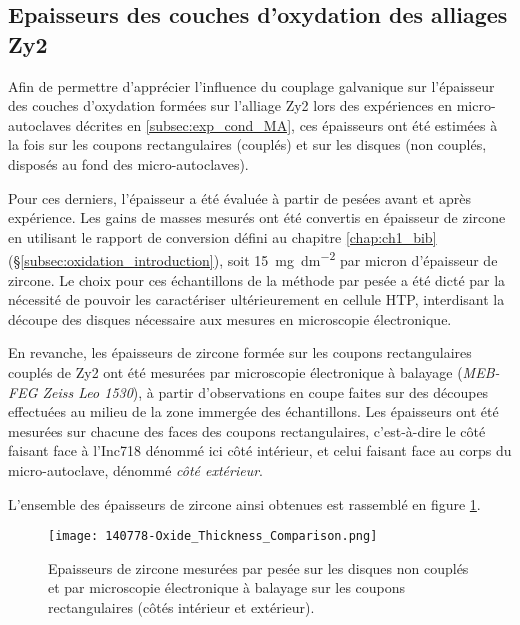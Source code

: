 \begin{refsection}
    
    \subsection{Epaisseurs des couches d’oxydation des alliages Zy2}\label{subsec:oxide_thickness}
    
    Afin de permettre d’apprécier l’influence du couplage galvanique
    sur l’épaisseur des couches d’oxydation formées sur l’alliage Zy2
    lors des expériences en micro-autoclaves décrites en \ref{subsec:exp_cond_MA}, ces épaisseurs
    ont été estimées à la fois sur les coupons rectangulaires (couplés) et sur
    les disques (non couplés, disposés au fond des micro-autoclaves).

    Pour ces derniers, l’épaisseur a été évaluée à partir de pesées avant et après expérience.
    Les gains de masses mesurés ont été convertis en épaisseur de zircone en utilisant
    le rapport de conversion défini au chapitre \ref{chap:ch1_bib} (\S \ref{subsec:oxidation_introduction}),
    soit \SI{15}{\milli\gram\per\square\deci\meter}
    par micron d’épaisseur de zircone. Le choix pour ces échantillons de la méthode par pesée
    a été dicté par la nécessité de pouvoir les caractériser ultérieurement en cellule HTP, interdisant
    la découpe des disques nécessaire aux mesures en microscopie électronique. 

    En revanche, les épaisseurs de zircone formée sur les coupons rectangulaires
    couplés de Zy2 ont été mesurées par microscopie électronique à balayage
    (\emph{MEB-FEG Zeiss Leo 1530}), à partir d’observations en coupe faites sur des
    découpes effectuées au milieu de la zone immergée des échantillons.
    Les épaisseurs ont été mesurées sur chacune des faces des coupons rectangulaires,
    c’est-à-dire le côté faisant face à l’Inc718 dénommé ici côté intérieur,
    et celui faisant face au corps du micro-autoclave, dénommé \emph{côté extérieur}. 

    L’ensemble des épaisseurs de zircone ainsi obtenues est rassemblé en figure \ref{fig:ch4_oxide_thickness}.

    \begin{figure}[H]
        \centering
        \texttt{[image: 140778-Oxide\_Thickness\_Comparison.png]}
        \caption{Epaisseurs de zircone mesurées par pesée sur les disques non couplés et par microscopie 
        électronique à balayage sur les coupons rectangulaires (côtés intérieur et extérieur).}
        \label{fig:ch4_oxide_thickness}
    \end{figure}



\end{refsection}
